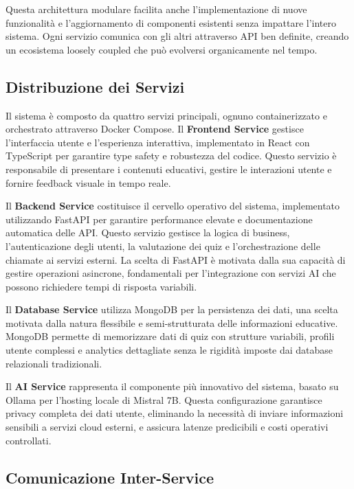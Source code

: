 \documentclass[12pt,a4paper]{article}
\begin{document}
Questa architettura modulare facilita anche l'implementazione di nuove funzionalità e l'aggiornamento di componenti esistenti senza impattare l'intero sistema. Ogni servizio comunica con gli altri attraverso API ben definite, creando un ecosistema loosely coupled che può evolversi organicamente nel tempo.

\subsection{Distribuzione dei Servizi}

Il sistema è composto da quattro servizi principali, ognuno containerizzato e orchestrato attraverso Docker Compose. Il \textbf{Frontend Service} gestisce l'interfaccia utente e l'esperienza interattiva, implementato in React con TypeScript per garantire type safety e robustezza del codice. Questo servizio è responsabile di presentare i contenuti educativi, gestire le interazioni utente e fornire feedback visuale in tempo reale.

Il \textbf{Backend Service} costituisce il cervello operativo del sistema, implementato utilizzando FastAPI per garantire performance elevate e documentazione automatica delle API. Questo servizio gestisce la logica di business, l'autenticazione degli utenti, la valutazione dei quiz e l'orchestrazione delle chiamate ai servizi esterni. La scelta di FastAPI è motivata dalla sua capacità di gestire operazioni asincrone, fondamentali per l'integrazione con servizi AI che possono richiedere tempi di risposta variabili.

Il \textbf{Database Service} utilizza MongoDB per la persistenza dei dati, una scelta motivata dalla natura flessibile e semi-strutturata delle informazioni educative. MongoDB permette di memorizzare dati di quiz con strutture variabili, profili utente complessi e analytics dettagliate senza le rigidità imposte dai database relazionali tradizionali.

Il \textbf{AI Service} rappresenta il componente più innovativo del sistema, basato su Ollama per l'hosting locale di Mistral 7B. Questa configurazione garantisce privacy completa dei dati utente, eliminando la necessità di inviare informazioni sensibili a servizi cloud esterni, e assicura latenze predicibili e costi operativi controllati.

\subsection{Comunicazione Inter-Service}
\end{document}
